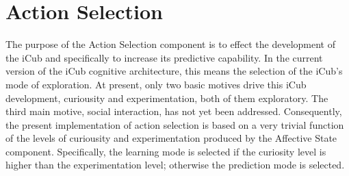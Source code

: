 \documentclass[a4paper, 12pt]{report}
\begin{document}
\section{Action Selection}
The purpose of the Action Selection component is to effect the development of 
the iCub and specifically to increase its predictive capability. In the current 
version of the iCub cognitive architecture, this means the selection of the 
iCub’s mode of exploration. At present, only two basic motives drive this iCub 
development, curiousity and experimentation, both of them exploratory. The 
third main motive, social interaction, has not yet been 
addressed.\textbf{\cite{vernon}} 
Consequently, the present implementation of action selection is based on a very 
trivial function of the levels of curiousity and experimentation produced by 
the Affective State component. Specifically, the learning mode is selected if 
the curiosity level is higher than the experimentation level; otherwise the 
prediction mode is selected.
\end{document}

